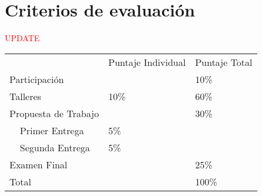 \documentclass[11pt]{article}
\begin{document}
\section{Criterios de evaluación} \label{sec:evaluacion}
\textcolor{red}{UPDATE}

\begin{table}[]
\begin{tabular}{llll}
\multicolumn{2}{l}{}                       & Puntaje Individual & Puntaje Total \\
\multicolumn{2}{l}{Participación}          &                    & 10\%          \\
\multicolumn{2}{l}{Talleres}               & 10\%               & 60\%          \\
\multicolumn{2}{l}{Propuesta de   Trabajo} &                    & 30\%          \\
              & Primer Entrega             & 5\%                &               \\
              & Segunda Entrega            & 5\%                &               \\
\multicolumn{2}{l}{Examen Final}           &                    & 25\%          \\
\multicolumn{2}{l}{Total}                  &                    & 100\%        
\end{tabular}
\end{table}
\end{document}
